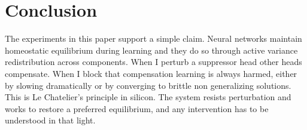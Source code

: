 \section{Conclusion}

The experiments in this paper support a simple claim. Neural networks maintain homeostatic equilibrium during learning and they do so through active variance redistribution across components. When I perturb a suppressor head other heads compensate. When I block that compensation learning is always harmed, either by slowing dramatically or by converging to brittle non generalizing solutions. This is Le Chatelier's principle in silicon. The system resists perturbation and works to restore a preferred equilibrium, and any intervention has to be understood in that light.
